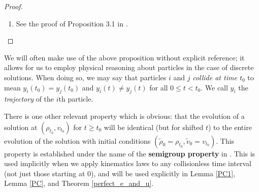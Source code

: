 \documentclass[11pt]{article}
\numberwithin{equation}{section}
\begin{document}
\begin{proof}
\begin{enumerate}
\begin{align*}
                \\&
                =-\int v_0(S_0^{-1}(z))\varphi(0,z)\bar \rho_0(dz),
            \end{align*}
            where $A$ is the interaction term
            \begin{align*}A&=-\int_0^T \!\! \iint \! \tilde \varphi(t,y)\mathrm{sgn} (y-z)\rho_t(dz)\rho_t(dy)dt
            =-\int_0^T \!\! \iint \! \varphi(t,S_t(y))\mathrm{sgn}(S_t(y)-S_t(z))\rho_t(dz)\rho_t(dy)dt
            \\&
            =-\int_0^T \!\! \iint \! \varphi(t,y)\mathrm{sgn} (y-z)\bar\rho_t(dz)\bar\rho_t(dy)dt.
            \end{align*}
            Now multiply \eqref{new-cont-eq} by $m_0$ and subtract from the equation above to get the momentum equation for $(\bar\rho,\bar v)$. Since $S_t$ is invertible for all $t\geq0$, it is obvious that the converse holds as well.
            \item See the proof of Proposition 3.1 in \cite{BLPTW}.\qedhere  
        \end{enumerate}
        \end{proof}
        We will often make use of the above proposition without explicit reference; it allows for us to employ physical reasoning about particles in the case of discrete solutions. When doing so, we may say that particles $i$ and $j$ \emph{collide at time $t_0$} to mean $y_i(t_0)=y_j(t_0)$ and $y_i(t)\neq y_j(t)$ for all $0\leq t<t_0$. We call $y_i$ the \emph{trajectory} of the $i$th particle. 

        There is one other relevant property which is obvious: that the evolution of a solution at $(\rho_{t_0}, v_{t_0})$ for $t \ge t_0$ will be identical (but for shifted $t$) to the entire evolution of the solution with initial conditions $(\tilde{\rho}_0=\rho_{t_0}, \tilde{v}_0=v_{t_0})$. This property is established under the name of the \textbf{semigroup property} in \cite{BLPTW}. This is used implicitly when we apply kinematics laws to any collisionless time interval (not just those starting at 0), and will be used explicitly in Lemma \ref{PC1}, Lemma \ref{PC}, and Theorem \ref{perfect_e_and_u}.
\end{document}
